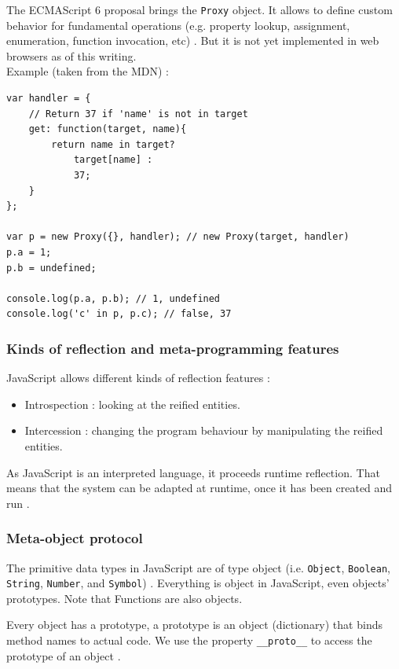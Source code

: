 \documentclass[a4paper,10pt]{article}
\begin{document}
The ECMAScript 6 proposal brings the \lstinline|Proxy| object.
It allows to define custom behavior for fundamental operations (e.g. property lookup, assignment, enumeration, function invocation, etc) \cite{js:proxy}.
But it is not yet implemented in web browsers as of this writing. \\
Example (taken from the MDN) :
\begin{lstlisting}
var handler = {
    // Return 37 if 'name' is not in target
    get: function(target, name){
        return name in target?
            target[name] :
            37;
    }
};

var p = new Proxy({}, handler); // new Proxy(target, handler)
p.a = 1;
p.b = undefined;

console.log(p.a, p.b); // 1, undefined
console.log('c' in p, p.c); // false, 37
\end{lstlisting}



\subsubsection{Kinds of reflection and meta-programming features}

JavaScript allows different kinds of reflection features :
\begin{itemize}
    \item Introspection : looking at the reified entities.
    \item Intercession : changing the program behaviour by manipulating the reified entities.
\end{itemize}

As JavaScript is an interpreted language, it proceeds runtime reflection.
That means that the system can be adapted at runtime, once it has been created and run \cite{js:objectmodel}.



\subsubsection{Meta-object protocol}

The primitive data types in JavaScript are of type object (i.e. \lstinline|Object|, \mbox{\lstinline|Boolean|,} \lstinline|String|, \lstinline|Number|, and \lstinline|Symbol|) \cite{js:datatypes}.
Everything is object in JavaScript, even objects’ prototypes.
Note that Functions are also objects.

Every object has a prototype, a prototype is an object (dictionary) that binds method names to actual code.
We use the property \lstinline|__proto__| to access the prototype of an object \cite{js:mop}.
\end{document}
